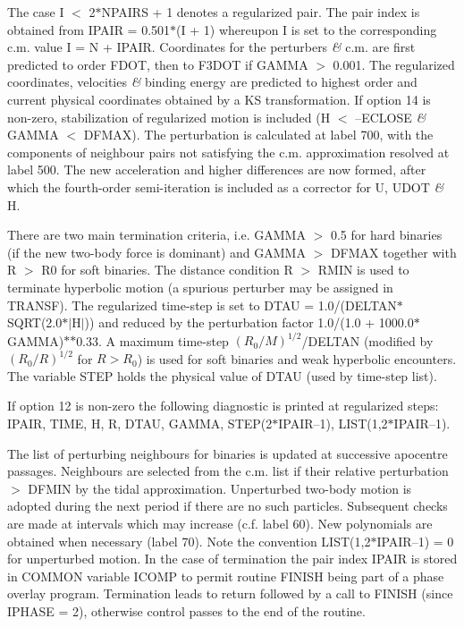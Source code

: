  The case I $<$ 2$\ast$NPAIRS + 1 denotes a regularized
 pair.  The pair index is obtained from IPAIR = 0.501$\ast$(I + 1)
 whereupon I is set to the corresponding c.m. value I = N +
 IPAIR.  Coordinates for the perturbers {\it\&} c.m. are first predicted to
 order FDOT, then to F3DOT if GAMMA $>$ 0.001.  The
 regularized coordinates, velocities {\it\&} binding
 energy are predicted to highest order and current physical coordinates
 obtained by a KS transformation.  If option 14 is non-zero, stabilization of
 regularized motion is included (H $<$ --ECLOSE {\it\&} GAMMA $<$ DFMAX).  The
 perturbation is calculated at label 700,
 with the components of neighbour pairs not satisfying the c.m. approximation
 resolved at label 500.  The new acceleration and higher differences are now
  formed,
 after which the fourth-order semi-iteration is included as a corrector 
 for U, UDOT {\it\&} H.    

   There are two main termination criteria, i.e. GAMMA
 $>$ 0.5 for hard binaries (if the new two-body force is dominant) and GAMMA $>$
 DFMAX together with R $>$ R0 for soft binaries.  The distance condition R $>$ RMIN
 is used to terminate hyperbolic motion (a spurious perturber
 may be assigned in TRANSF).  The regularized time-step is set to
 DTAU = 1.0/(DELTAN$\ast$SQRT(2.0$\ast$$\vert$H$\vert$)) and reduced by the
 perturbation factor 1.0/(1.0 + 1000.0$\ast$GAMMA)$\ast$$\ast$0.33.  A maximum time-step
 $(R_0/M)^{1/2}$/DELTAN (modified by $(R_0/R)^{1/2}$ for $R > R_0$)
 is used for soft binaries and weak
 hyperbolic encounters.  The variable STEP holds the physical value of
 DTAU (used by time-step list).

 If option 12 is non-zero the following diagnostic is printed at 
 regularized steps: IPAIR, TIME, H, R, DTAU, GAMMA, STEP(2$\ast$IPAIR--1),
  LIST(1,2$\ast$IPAIR--1).

 The list of perturbing neighbours for
 binaries is updated at successive apocentre passages.  Neighbours are
 selected from the c.m. list if their relative perturbation $>$ DFMIN by the
 tidal approximation.  Unperturbed two-body motion is adopted during the next
 period if there are no such particles.  Subsequent checks are made at intervals
 which may increase (c.f. label 60).  New polynomials are obtained when
 necessary (label 70).  Note the convention LIST(1,2$\ast$IPAIR--1) = 0 for
 unperturbed motion.  In the case of termination the pair index IPAIR
 is stored in COMMON variable ICOMP to permit routine FINISH being part of a
 phase overlay program.  Termination leads to return followed by a call to
 FINISH (since IPHASE = 2), otherwise control passes to the end of the routine.

